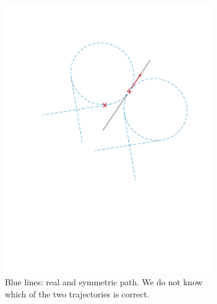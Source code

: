 \begin{itemize}
\begin{figure}[!htbp]
   \begin{subfigure}[b]{0.45\textwidth}
        \includegraphics[width=\textwidth]{img/circular_movment3.pdf}
        \caption{Blue lines: real and symmetric path. We do not know which of the two trajectories is correct.}
        \label{fig:three}
   \end{subfigure}\hfill
    \begin{subfigure}[b]{0.45\textwidth}

\end{subfigure}
\end{figure}
\end{itemize}
